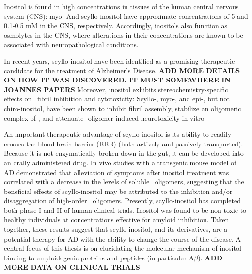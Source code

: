 Inositol is found in high concentrations in tissues of the human central nervous system (CNS): myo- And scyllo-inositol have approximate concentrations of 5 and 0.1-0.5 mM in the CNS, respectively.\cite{Fisher:2002tk} Accordingly, inositols also function as osmolytes in the CNS, where alterations in their concentrations are known to be associated with neuropathological conditions.\cite{Michaelis:1993gf, Fisher:2002tk}

In recent years, scyllo-inositol have been identified as a promising therapeutic candidate for the treatment of Alzheimer's Disease. \textbf{ADD MORE DETAILS ON HOW IT WAS DISCOVERED.  IT MUST SOMEWHERE IN JOANNES PAPERS} 
Moreover, inositol exhibits stereochemistry-specific effects on \abeta\  fibril inhibition and cytotoxicity: \cite{McLaurin:2000bq} Scyllo-, myo-, and epi-, but not chiro-inositol, have been shown to inhibit  fibril assembly, stabilize an oligomeric complex of , and attenuate \abeta-oligomer-induced neurotoxicity in vitro. 

An important therapeutic advantage of scyllo-inositol is its ability to readily crosses the bloodbrain barrier (BBB) (both actively and passively transported). Because it is not enzymatically broken down in the gut, it can be developed into an orally administered drug. %
In vivo studies with a transgenic mouse model of AD demonstrated that alleviation of symptoms after inositol treatment was correlated with a decrease in the levels of soluble \abeta\ oligomers, suggesting that the beneficial effects of scyllo-inositol may be attributed to the inhibition and/or disaggregation of high-order \abeta\ oligomers.\cite{McLaurin:2006eb}
Presently, scyllo-inositol has completed both phase I and II of human clinical trials.  Inositol was found to be non-toxic to healthy individuals at concentrations effective for amyloid inhibition. Taken together, these results suggest that scyllo-inositol, and its derivatives, are a potential therapy for AD with the ability to change the course of the disease.\cite{Nitz:2008jl,Sun:2008ko}  A central focus of this thesis is on elucidating the molecular mechanism of inositol binding to amyloidogenic proteins and peptides (in particular A$\beta$).
\textbf{ADD MORE DATA ON CLINICAL TRIALS}

